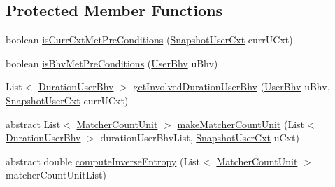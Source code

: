 \subsection*{\-Protected \-Member \-Functions}
\begin{DoxyCompactItemize}
\item 
boolean \hyperlink{classlab_1_1davidahn_1_1appshuttle_1_1predict_1_1matcher_1_1_matcher_3_01_c_01extends_01_base_matcher_conf_01_4_a76ffe587fe4bd57119ed53647013066d}{is\-Curr\-Cxt\-Met\-Pre\-Conditions} (\hyperlink{classlab_1_1davidahn_1_1appshuttle_1_1collect_1_1_snapshot_user_cxt}{\-Snapshot\-User\-Cxt} curr\-U\-Cxt)
\item 
boolean \hyperlink{classlab_1_1davidahn_1_1appshuttle_1_1predict_1_1matcher_1_1_matcher_3_01_c_01extends_01_base_matcher_conf_01_4_a480e1280115331bd50723d2a5dafa236}{is\-Bhv\-Met\-Pre\-Conditions} (\hyperlink{interfacelab_1_1davidahn_1_1appshuttle_1_1collect_1_1bhv_1_1_user_bhv}{\-User\-Bhv} u\-Bhv)
\item 
\-List$<$ \hyperlink{classlab_1_1davidahn_1_1appshuttle_1_1collect_1_1bhv_1_1_duration_user_bhv}{\-Duration\-User\-Bhv} $>$ \hyperlink{classlab_1_1davidahn_1_1appshuttle_1_1predict_1_1matcher_1_1_matcher_3_01_c_01extends_01_base_matcher_conf_01_4_ad39d4dcce8a977539d9d70f4db42a504}{get\-Involved\-Duration\-User\-Bhv} (\hyperlink{interfacelab_1_1davidahn_1_1appshuttle_1_1collect_1_1bhv_1_1_user_bhv}{\-User\-Bhv} u\-Bhv, \hyperlink{classlab_1_1davidahn_1_1appshuttle_1_1collect_1_1_snapshot_user_cxt}{\-Snapshot\-User\-Cxt} curr\-U\-Cxt)
\item 
abstract \-List$<$ \hyperlink{classlab_1_1davidahn_1_1appshuttle_1_1predict_1_1matcher_1_1_matcher_count_unit}{\-Matcher\-Count\-Unit} $>$ \hyperlink{classlab_1_1davidahn_1_1appshuttle_1_1predict_1_1matcher_1_1_matcher_3_01_c_01extends_01_base_matcher_conf_01_4_a4deadebe1e914b155a48d18822d4c95d}{make\-Matcher\-Count\-Unit} (\-List$<$ \hyperlink{classlab_1_1davidahn_1_1appshuttle_1_1collect_1_1bhv_1_1_duration_user_bhv}{\-Duration\-User\-Bhv} $>$ duration\-User\-Bhv\-List, \hyperlink{classlab_1_1davidahn_1_1appshuttle_1_1collect_1_1_snapshot_user_cxt}{\-Snapshot\-User\-Cxt} u\-Cxt)
\item 
abstract double \hyperlink{classlab_1_1davidahn_1_1appshuttle_1_1predict_1_1matcher_1_1_matcher_3_01_c_01extends_01_base_matcher_conf_01_4_aaf9b09c054e063878f92b8488520f558}{compute\-Inverse\-Entropy} (\-List$<$ \hyperlink{classlab_1_1davidahn_1_1appshuttle_1_1predict_1_1matcher_1_1_matcher_count_unit}{\-Matcher\-Count\-Unit} $>$ matcher\-Count\-Unit\-List)

\end{DoxyCompactItemize}
